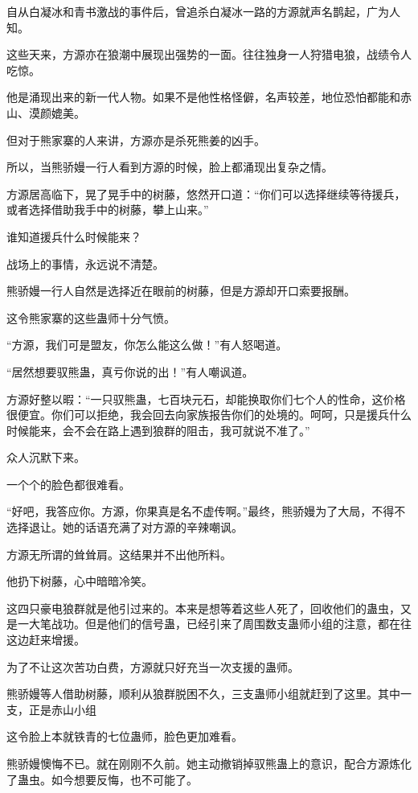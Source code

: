 
\begin{this_body}

自从白凝冰和青书激战的事件后，曾追杀白凝冰一路的方源就声名鹊起，广为人知。

这些天来，方源亦在狼潮中展现出强势的一面。往往独身一人狩猎电狼，战绩令人吃惊。

他是涌现出来的新一代人物。如果不是他性格怪僻，名声较差，地位恐怕都能和赤山、漠颜媲美。

但对于熊家寨的人来讲，方源亦是杀死熊姜的凶手。

所以，当熊骄嫚一行人看到方源的时候，脸上都涌现出复杂之情。

方源居高临下，晃了晃手中的树藤，悠然开口道：“你们可以选择继续等待援兵，或者选择借助我手中的树藤，攀上山来。”

谁知道援兵什么时候能来？

战场上的事情，永远说不清楚。

熊骄嫚一行人自然是选择近在眼前的树藤，但是方源却开口索要报酬。

这令熊家寨的这些蛊师十分气愤。

“方源，我们可是盟友，你怎么能这么做！”有人怒喝道。

“居然想要驭熊蛊，真亏你说的出！”有人嘲讽道。

方源好整以暇：“一只驭熊蛊，七百块元石，却能换取你们七个人的性命，这价格很便宜。你们可以拒绝，我会回去向家族报告你们的处境的。呵呵，只是援兵什么时候能来，会不会在路上遇到狼群的阻击，我可就说不准了。”

众人沉默下来。

一个个的脸色都很难看。

“好吧，我答应你。方源，你果真是名不虚传啊。”最终，熊骄嫚为了大局，不得不选择退让。她的话语充满了对方源的辛辣嘲讽。

方源无所谓的耸耸肩。这结果并不出他所料。

他扔下树藤，心中暗暗冷笑。

这四只豪电狼群就是他引过来的。本来是想等着这些人死了，回收他们的蛊虫，又是一大笔战功。但是他们的信号蛊，已经引来了周围数支蛊师小组的注意，都在往这边赶来增援。

为了不让这次苦功白费，方源就只好充当一次支援的蛊师。

熊骄嫚等人借助树藤，顺利从狼群脱困不久，三支蛊师小组就赶到了这里。其中一支，正是赤山小组

这令脸上本就铁青的七位蛊师，脸色更加难看。

熊骄嫚懊悔不已。就在刚刚不久前。她主动撤销掉驭熊蛊上的意识，配合方源炼化了蛊虫。如今想要反悔，也不可能了。


\end{this_body}
